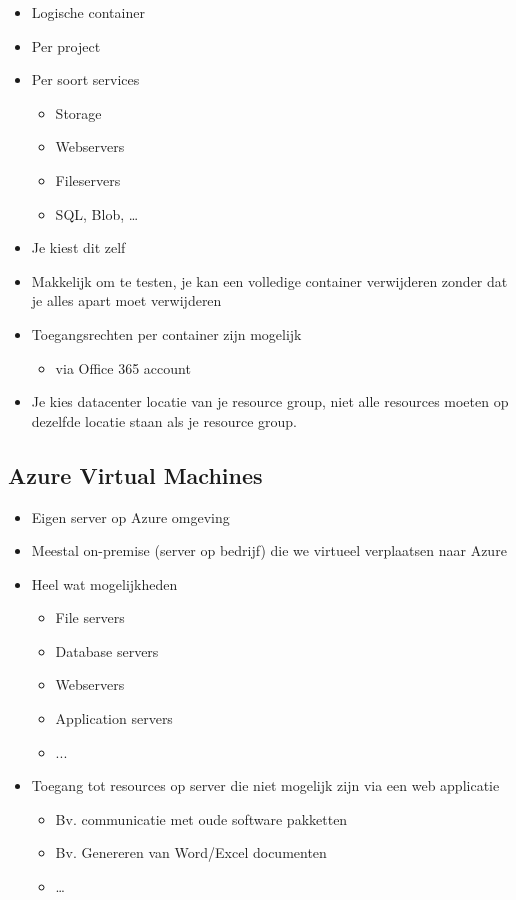 \documentclass{article}
\begin{document}
\begin{itemize}
    \item Logische container
    \item Per project
    \item Per soort services
    \begin{itemize}
        \item Storage
        \item Webservers
        \item Fileservers
        \item SQL, Blob, \dots
    \end{itemize}
    \item Je kiest dit zelf
    \item Makkelijk om te testen, je kan een volledige container verwijderen zonder dat je alles apart moet verwijderen
    \item Toegangsrechten per container zijn mogelijk
    \begin{itemize}
        \item via Office 365 account
    \end{itemize}
    \item Je kies datacenter locatie van je resource group, niet alle resources moeten op dezelfde locatie staan als je resource group.
\end{itemize}

\subsection{Azure Virtual Machines}
\begin{itemize}
    \item Eigen server op Azure omgeving
    \item Meestal on-premise (server op bedrijf) die we virtueel verplaatsen naar Azure
    \item Heel wat mogelijkheden
    \begin{itemize}
        \item File servers
        \item Database servers
        \item Webservers
        \item Application servers
        \item ...
    \end{itemize}
    \item Toegang tot resources op server die niet mogelijk zijn via een web applicatie
    \begin{itemize}
        \item Bv. communicatie met oude software pakketten
        \item Bv. Genereren van Word/Excel documenten
        \item \dots
    \end{itemize}
\end{itemize}
\end{document}
